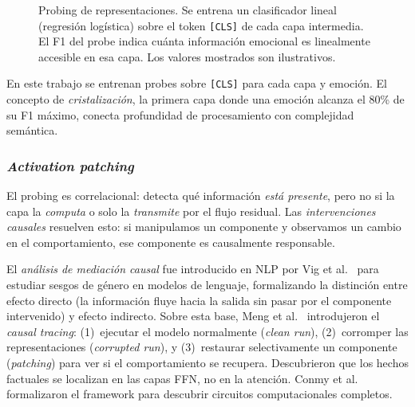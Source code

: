 \begin{figure}[H]
    \shorthandon{><}
    \caption{Probing de representaciones. Se entrena un clasificador lineal
    (regresión logística) sobre el token \texttt{[CLS]} de cada capa intermedia.
    El F1 del probe indica cuánta información emocional es linealmente accesible
    en esa capa. Los valores mostrados son ilustrativos.}
    \label{fig:probing-schema}
\end{figure}

En este trabajo se entrenan probes sobre \texttt{[CLS]} para cada capa y emoción.
El concepto de \emph{cristalización}, la primera capa donde una emoción alcanza
el 80\% de su F1 máximo, conecta profundidad de procesamiento con complejidad
semántica.

\subsubsection{\emph{Activation patching}}
\label{sec:sota-patching}

El probing es correlacional: detecta qué información \emph{está presente}, pero no
si la capa la \emph{computa} o solo la \emph{transmite} por el flujo residual. Las
\emph{intervenciones causales} resuelven esto: si manipulamos un componente y
observamos un cambio en el comportamiento, ese componente es causalmente responsable.

El \emph{análisis de mediación causal} fue introducido en NLP por Vig et
al.~\cite{vig2020causal} para estudiar sesgos de género en modelos de
lenguaje, formalizando la distinción entre efecto directo (la
información fluye hacia la salida sin pasar por el componente
intervenido) y efecto indirecto. Sobre esta base, Meng et al.\
\cite{meng2022locating} introdujeron el \emph{causal tracing}:
(1)~ejecutar el modelo normalmente (\emph{clean run}), (2)~corromper
las representaciones (\emph{corrupted run}), y (3)~restaurar
selectivamente un componente (\emph{patching}) para ver si el
comportamiento se recupera. Descubrieron que los hechos factuales se
localizan en las capas FFN, no en la atención. Conmy et al.\
\cite{conmy2023towards} formalizaron el framework para descubrir
circuitos computacionales completos.

